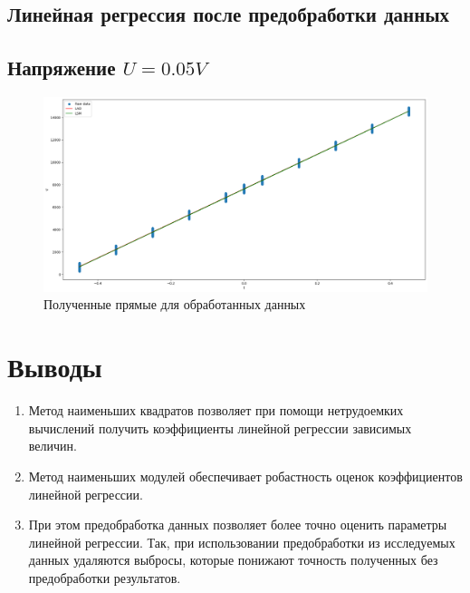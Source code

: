 \documentclass[12pt,a4paper]{article}
\begin{document}
\subsection{Линейная регрессия после предобработки данных}
\subsection{Напряжение $U = 0.05V$}
\begin{figure}[htbp!]
    \begin{center}
        \includegraphics[width = 1\linewidth]{filtered.png}
        \caption{Полученные прямые для обработанных данных}
    \end{center}
\end{figure}

\newpage

\section{Выводы}

\begin{enumerate}
    \item Метод наименьших квадратов позволяет при помощи нетрудоемких вычислений получить коэффициенты линейной регрессии зависимых величин.
    \item Метод наименьших модулей обеспечивает робастность оценок коэффициентов линейной регрессии.
    \item При этом предобработка данных позволяет более точно оценить параметры линейной регрессии. Так, при использовании предобработки из исследуемых данных удаляются выбросы, которые понижают точность полученных без предобработки результатов.
\end{enumerate}

\newpage
\end{document}
